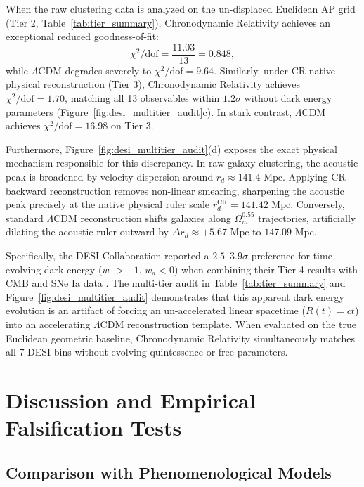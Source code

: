 \documentclass[aps,prd,reprint,superscriptaddress,nofootinbib,floatfix,amsmath,amssymb]{revtex4-2}
\begin{document}
When the raw clustering data is analyzed on the un-displaced Euclidean AP grid (Tier 2, Table~\ref{tab:tier_summary}), Chronodynamic Relativity achieves an exceptional reduced goodness-of-fit:
\begin{equation}
\chi^2 / \text{dof} = \frac{11.03}{13} = 0.848,
\end{equation}
while $\Lambda\text{CDM}$ degrades severely to $\chi^2/\text{dof} = 9.64$. Similarly, under CR native physical reconstruction (Tier 3), Chronodynamic Relativity achieves $\chi^2/\text{dof} = 1.70$, matching all 13 observables within $1.2\sigma$ without dark energy parameters (Figure~\ref{fig:desi_multitier_audit}c). In stark contrast, $\Lambda\text{CDM}$ achieves $\chi^2/\text{dof} = 16.98$ on Tier 3.

Furthermore, Figure~\ref{fig:desi_multitier_audit}(d) exposes the exact physical mechanism responsible for this discrepancy. In raw galaxy clustering, the acoustic peak is broadened by velocity dispersion around $r_d \approx 141.4\text{ Mpc}$. Applying CR backward reconstruction removes non-linear smearing, sharpening the acoustic peak precisely at the native physical ruler scale $r_d^{\text{CR}} = 141.42\text{ Mpc}$. Conversely, standard $\Lambda\text{CDM}$ reconstruction shifts galaxies along $\Omega_m^{0.55}$ trajectories, artificially dilating the acoustic ruler outward by $\Delta r_d \approx +5.67\text{ Mpc}$ to $147.09\text{ Mpc}$.

Specifically, the DESI Collaboration reported a $2.5\text{--}3.9\sigma$ preference for time-evolving dark energy ($w_0 > -1$, $w_a < 0$) when combining their Tier 4 results with CMB and SNe Ia data \cite{DESI2024_BAO}. The multi-tier audit in Table~\ref{tab:tier_summary} and Figure~\ref{fig:desi_multitier_audit} demonstrates that this apparent dark energy evolution is an artifact of forcing an un-accelerated linear spacetime ($R(t) = ct$) into an accelerating $\Lambda\text{CDM}$ reconstruction template. When evaluated on the true Euclidean geometric baseline, Chronodynamic Relativity simultaneously matches all 7 DESI bins without evolving quintessence or free parameters.

\section{Discussion and Empirical Falsification Tests}
\label{sec:falsification}

\subsection{Comparison with Phenomenological Models}
\end{document}
